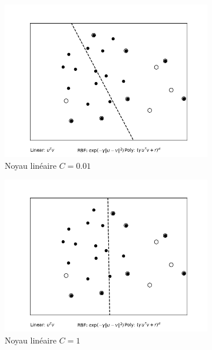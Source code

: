 \documentclass[12pt]{article}
\begin{document}
\begin{figure}[H]
    \centering
    \begin{subfigure}{0.32\textwidth}
        \centering
        \includegraphics[width=\linewidth]{images/linC=0.01.png}
        \caption{Noyau linéaire $C=0.01$}
    \end{subfigure}
    \begin{subfigure}{0.32\textwidth}
        \centering
        \includegraphics[width=\linewidth]{images/linC=1.png}
        \caption{Noyau linéaire $C=1$}
    \end{subfigure}
    \begin{subfigure}{0.32\textwidth}
        \centering

\end{subfigure}
\end{figure}
\end{document}
